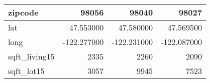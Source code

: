 \begin{table}[H]
\begin{tabular}{|l|r|r|r|}
\hline zipcode & \cellcolor[rgb]{0.9, 0.54, 0.52} 98056 & 98040 & 98027 \\
\hline lat & \cellcolor[rgb]{0.9, 0.54, 0.52} 47.553000 & 47.580000 & 47.569500 \\
\hline long & \cellcolor[rgb]{0.9, 0.54, 0.52} -122.277000 & \cellcolor[rgb]{0.9, 0.54, 0.52} -122.231000 & \cellcolor[rgb]{0.9, 0.54, 0.52} -122.087000 \\
\hline sqft\_living15 & \cellcolor[rgb]{0.9, 0.54, 0.52} 2335 & 2260 & 2090 \\
\hline sqft\_lot15 & \cellcolor[rgb]{0.9, 0.54, 0.52} 3057 & 9945 & 7523 \\
\hline
\end{tabular}
\end{table}
